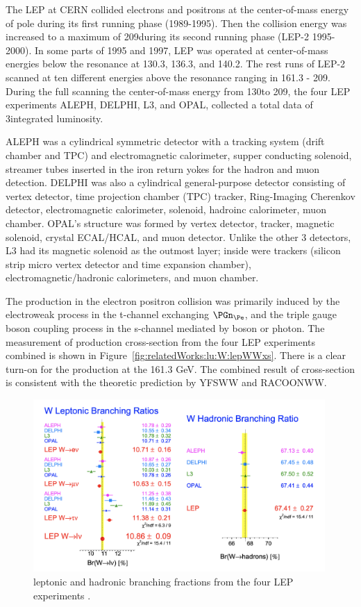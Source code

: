 The LEP at CERN collided electrons and positrons at the center-of-mass energy of \PZ pole during its first running phase (1989-1995). Then the collision energy was increased to a maximum of 209\GeV during its second running phase (LEP-2 1995-2000). In some parts of 1995 and 1997, LEP was operated at center-of-mass energies below the \WW resonance at 130.3\GeV, 136.3\GeV, and 140.2\GeV. The rest runs of LEP-2 scanned at ten different energies above the \WW resonance ranging in 161.3 - 209\GeV. During the full scanning the center-of-mass energy from 130\GeV to 209\GeV, the four LEP experiments ALEPH, DELPHI, L3, and OPAL, collected a total data of 3\fbinv integrated luminosity. 

ALEPH was a cylindrical symmetric detector with a tracking system  (drift chamber and TPC) and electromagnetic calorimeter, supper conducting solenoid, streamer tubes inserted in the iron return yokes for the hadron and muon detection. DELPHI was also a cylindrical general-purpose detector consisting of vertex detector, time projection chamber (TPC) tracker, Ring-Imaging Cherenkov detector, electromagnetic calorimeter, solenoid, hadroinc calorimeter, muon chamber. OPAL's structure was formed by vertex detector, tracker, magnetic solenoid, crystal ECAL/HCAL, and muon detector. Unlike the other 3 detectors, L3 had its magnetic solenoid as the outmost layer; inside were trackers (silicon strip micro vertex detector and time expansion chamber), electromagnetic/hadronic calorimeters, and muon chamber. 

The \WW production in the electron positron collision was primarily induced by the electroweak process in the t-channel exchanging $\PGn_\Pe$, and the triple gauge boson coupling process in the s-channel mediated by \PZ boson or photon. The measurement of \WW production cross-section from the four LEP experiments combined is shown in Figure~\ref{fig:relatedWorks:lu:W:lepWWxs}. There is a clear turn-on for the \WW production at the 161.3 GeV. The combined result of \WW cross-section is consistent with the theoretic prediction by YFSWW and RACOONWW.


\begin{figure}[ht]
    \centering
    \includegraphics[width=0.99\textwidth]{chapters/introduction/sectionRelatedWorks/figures/lep.png}
    \caption{\PW leptonic and hadronic branching fractions from the four LEP experiments \cite{Schael:2013ita}. }
    \label{fig:introduction:relatedWorks:lep}
\end{figure}


